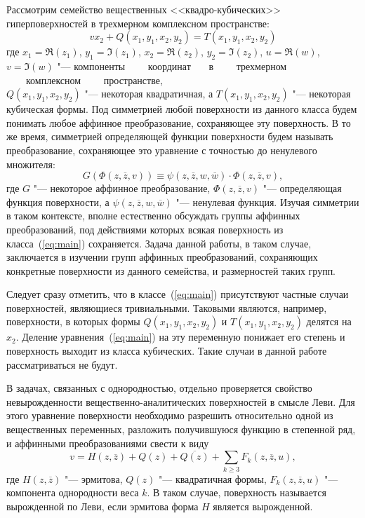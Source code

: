 \documentclass[../main.tex]{subfiles}
\begin{document}
Рассмотрим семейство вещественных <<квадро-кубических>> гиперповерхностей в трехмерном комплексном пространстве:
\begin{equation}\label{eq:main}
v x_2 + Q(x_1, y_1, x_2, y_2) = T(x_1, y_1, x_2, y_2)
\end{equation}
где $x_1 = \Re(z_1)$, $y_1 = \Im(z_1)$, $x_2 = \Re(z_2)$, $y_2 = \Im(z_2)$, $u = \Re(w)$, $v= \Im(w)$ "--- компоненты~~~~ координат ~~~в ~~~~трехмерном ~~~~комплексном ~~~~пространстве, \\$Q(x_1, y_1, x_2, y_2)$ "--- некоторая квадратичная, а $T(x_1, y_1, x_2, y_2)$ "--- некоторая кубическая формы. Под симметрией любой поверхности из данного класса будем понимать любое аффинное преобразование, сохраняющее эту поверхность. В то же время, симметрией определяющей функции поверхности будем называть преобразование, сохраняющее это уравнение с точностью до ненулевого множителя:
\begin{equation}\label{eq:preservation}
G(\Phi(z, \overline{z}, v)) \equiv \psi(z, \overline{z}, w, \overline{w}) \cdot \Phi(z, \overline{z}, v),
\end{equation}
где $G$ "--- некоторое аффинное преобразование, $\Phi(z, \overline z, v)$ "--- определяющая функция поверхности, а $\psi(z, \overline z, w, \overline w)$ "--- ненулевая функция. Изучая симметрии в таком контексте, вполне естественно обсуждать группы аффинных преобразований, под действиями которых всякая поверхность из класса~(\ref{eq:main}) сохраняется. Задача данной работы, в таком случае, заключается в изучении групп аффинных преобразований, сохраняющих конкретные поверхности из данного семейства, и размерностей таких групп.

Следует сразу отметить, что в классе~(\ref{eq:main}) присутствуют частные случаи поверхностей, являющиеся тривиальными. Таковыми являются, например, поверхности, в которых формы $Q(x_1, y_1, x_2, y_2)$ и $T(x_1, y_1, x_2, y_2)$ делятся на $x_2$. Деление уравнения~(\ref{eq:main}) на эту переменную понижает его степень и поверхность выходит из класса кубических. Такие случаи в данной работе рассматриваться не будут.

В задачах, связанных с однородностью, отдельно проверяется свойство невырожденности вещественно-аналитических поверхностей в смысле Леви. Для этого уравнение поверхности необходимо разрешить относительно одной из вещественных переменных, разложить получившуюся функцию в степенной ряд, и аффинными преобразованиями свести к виду
\begin{equation}
v = H(z, \overline z) + Q(z) + \overline{Q(z)} + \sum_{k \ge 3} F_k(z, \overline z, u),
\end{equation}
где $H(z, \overline z)$ "--- эрмитова, $Q(z)$ "--- квадратичная формы, $F_k(z, \overline z, u)$ "--- компонента однородности веса $k$. В таком случае, поверхность называется вырожденной по Леви, если эрмитова форма $H$ является вырожденной.
\end{document}
